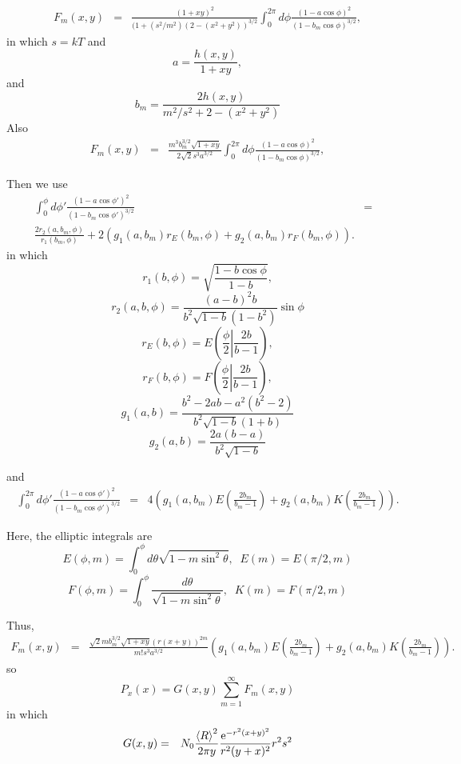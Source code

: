 \documentclass[11pt,openany]{report}
\newcommand{\e}{{\rm e}}
\begin{document}
{{\begin{eqnarray} F_{m}(x,y)&=&\frac{(1+xy)^{2}}{(1+(s^{2}/m^{2})(2-(x^{2}+y^{2}))^{3/2}}\int_{0}^{2\pi}d\phi\frac{\left(1-a\cos\phi \right)^{2}}{(1-b_m\cos\phi)^{3/2}},
\end{eqnarray}
in which $s=kT$ and 
$$a=\frac{h(x,y)}{1+xy},$$
and
$$b_m=\frac{2h(x,y)}{m^{2}/s^{2}+2-(x^{2}+y^{2})}$$
Also
\begin{eqnarray} F_{m}(x,y)&=&\frac{m^{3}b_{m}^{3/2}\sqrt{1+xy}}{2\sqrt{2}s^{3}a^{3/2}}\int_{0}^{2\pi}d\phi\frac{\left(1-a\cos\phi \right)^{2}}{(1-b_m\cos\phi)^{3/2}},
\end{eqnarray}


Then we use
\begin{eqnarray}
\int_{0}^{\phi}d\phi'\frac{\left(1-a\cos\phi' \right)^{2}}{(1-b_m\cos\phi')^{3/2}}&=&\\
\frac{2r_{2}(a,b_m,\phi)}{r_{1}(b_m,\phi)}+2(g_{1}(a,b_m)r_{E}(b_m,\phi)+g_{2}(a,b_m)r_{F}(b_m,\phi)).
\end{eqnarray}
in which
$$r_{1}(b,\phi)=\sqrt{\frac{1-b\cos\phi}{1-b}},$$
$$r_{2}(a,b,\phi)=\frac{(a-b)^{2}b}{b^{2}\sqrt{1-b}(1-b^{2})}\sin\phi$$
$$r_{E}(b,\phi)=E\left(\frac{\phi}{2}\left|\frac{2b}{b-1}\right.\right),$$
$$r_{F}(b,\phi)=F\left(\frac{\phi}{2}\left|\frac{2b}{b-1}\right.\right),$$
$$g_{1}(a,b)=\frac{b^{2}-2ab-a^{2}(b^{2}-2)}{b^{2}\sqrt{1-b}(1+b)}$$
$$g_{2}(a,b)=\frac{2a(b-a)}{b^{2}\sqrt{1-b}}$$

and
\begin{eqnarray}
\int_{0}^{2\pi}d\phi'\frac{\left(1-a\cos\phi' \right)^{2}}{(1-b_m\cos\phi')^{3/2}}&=&
4\left(g_{1}(a,b_m)E\left(\frac{2b_m}{b_m-1}\right)+g_{2}(a,b_m)K\left(\frac{2b_m}{b_m-1}\right)\right).
\end{eqnarray}

Here, the elliptic integrals are
$$E(\phi,m)=\int_{0}^{\phi}d\theta\sqrt{1-m\sin^{2}\theta},\;\;E(m)=E(\pi/2,m)$$
$$F(\phi,m)=\int_{0}^{\phi}\frac{d\theta}{\sqrt{1-m\sin^{2}\theta}},\;\;K(m)=F(\pi/2,m)$$

Thus, 
\begin{eqnarray} F_{m}(x,y)&=&\frac{\sqrt{2}mb_{m}^{3/2}\sqrt{1+xy}(r(x+y))^{2m}}{m!s^{3}a^{3/2}}\left(g_{1}(a,b_m)E\left(\frac{2b_m}{b_m-1}\right)+g_{2}(a,b_m)K\left(\frac{2b_m}{b_m-1}\right)\right).
\end{eqnarray}
so
$$P_{x}(x)=G(x,y)\sum_{m=1}^{\infty}F_{m}(x,y)$$
in which
\begin{eqnarray}
G(x,y)&=&N_{0}\frac{\left<R\right>^{2}}{2\pi y}\frac{\e^{-r^{2}(x+y)^{2}}}{r^{2}(y+x)^{2}}
r^{2}s^{2}
\end{eqnarray}


}}
\end{document}
